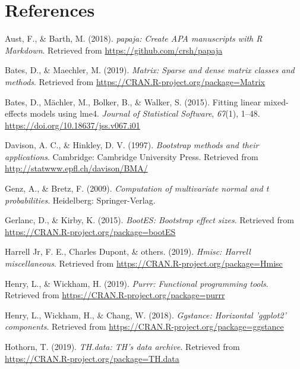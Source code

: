 \documentclass[man]{apa6}
\begin{document}
\newpage

\hypertarget{references}{%
\section{References}\label{references}}

\begingroup
\setlength{\parindent}{-0.5in}
\setlength{\leftskip}{0.5in}

\hypertarget{refs}{}
\leavevmode\hypertarget{ref-R-papaja}{}%
Aust, F., \& Barth, M. (2018). \emph{papaja: Create APA manuscripts with R Markdown}. Retrieved from \url{https://github.com/crsh/papaja}

\leavevmode\hypertarget{ref-R-Matrix}{}%
Bates, D., \& Maechler, M. (2019). \emph{Matrix: Sparse and dense matrix classes and methods}. Retrieved from \url{https://CRAN.R-project.org/package=Matrix}

\leavevmode\hypertarget{ref-R-lme4}{}%
Bates, D., Mächler, M., Bolker, B., \& Walker, S. (2015). Fitting linear mixed-effects models using lme4. \emph{Journal of Statistical Software}, \emph{67}(1), 1--48. \url{https://doi.org/10.18637/jss.v067.i01}

\leavevmode\hypertarget{ref-R-boot}{}%
Davison, A. C., \& Hinkley, D. V. (1997). \emph{Bootstrap methods and their applications}. Cambridge: Cambridge University Press. Retrieved from \url{http://statwww.epfl.ch/davison/BMA/}

\leavevmode\hypertarget{ref-R-mvtnorm}{}%
Genz, A., \& Bretz, F. (2009). \emph{Computation of multivariate normal and t probabilities}. Heidelberg: Springer-Verlag.

\leavevmode\hypertarget{ref-R-bootES}{}%
Gerlanc, D., \& Kirby, K. (2015). \emph{BootES: Bootstrap effect sizes}. Retrieved from \url{https://CRAN.R-project.org/package=bootES}

\leavevmode\hypertarget{ref-R-Hmisc}{}%
Harrell Jr, F. E., Charles Dupont, \& others. (2019). \emph{Hmisc: Harrell miscellaneous}. Retrieved from \url{https://CRAN.R-project.org/package=Hmisc}

\leavevmode\hypertarget{ref-R-purrr}{}%
Henry, L., \& Wickham, H. (2019). \emph{Purrr: Functional programming tools}. Retrieved from \url{https://CRAN.R-project.org/package=purrr}

\leavevmode\hypertarget{ref-R-ggstance}{}%
Henry, L., Wickham, H., \& Chang, W. (2018). \emph{Ggstance: Horizontal 'ggplot2' components}. Retrieved from \url{https://CRAN.R-project.org/package=ggstance}

\leavevmode\hypertarget{ref-R-TH.data}{}%
Hothorn, T. (2019). \emph{TH.data: TH's data archive}. Retrieved from \url{https://CRAN.R-project.org/package=TH.data}
\end{document}
